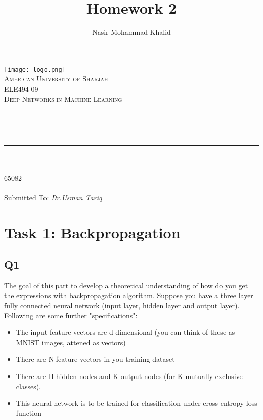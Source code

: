 \documentclass[a4paper, 12pt]{article}
\title{Homework 2}
\author{Nasir Mohammad Khalid}
\makeatletter
\let\thetitle\@title
\let\theauthor\@author
\let\thedate\@date
\makeatother
\begin{document}
 
    \begin{titlepage}
        \centering
        \vspace*{0.5 cm}
        \texttt{[image: logo.png]}\\[1.0 cm]	%
        \textsc{\LARGE American University of Sharjah}\\[1.0 cm]
        \textsc{\Large ELE494-09}\\[0.2 cm]	
        \textsc{\Large Deep Networks in Machine Learning}\\[0.5 cm]			%
        \rule{\linewidth}{0.2 mm} \\[0.4 cm]
        { \huge \bfseries \thetitle}\\
        \rule{\linewidth}{0.2 mm} \\[1.5 cm]
        
        \textsc{\Large{\theauthor}}\\[0.3 cm]
        \textsc{\Large{65082}}\\[0.3 cm]
        \textsc{\Large{\thedate}}\\[1.5 cm]

        \textmd{Submitted To: \itshape{Dr.Usman Tariq}}
    \end{titlepage}

    \clearpage
    \tableofcontents
    \listoffigures
    \lstlistoflistings
    \clearpage

    \section{Task 1: Backpropagation}

    \subsection{Q1}

    The goal of this part to develop a theoretical understanding of how do you get the expressions with
    backpropagation algorithm. Suppose you have a three layer fully connected neural network (input layer,
    hidden layer and output layer). Following are some further "specifications":

    \begin{itemize}
        \item The input feature vectors are d dimensional (you can think of these as MNIST images, attened as vectors)
        \item There are N feature vectors in you training dataset
        \item There are H hidden nodes and K output nodes (for K mutually exclusive classes).
        \item This neural network is to be trained for classification under cross-entropy loss function
    \end{itemize}
\end{document}
